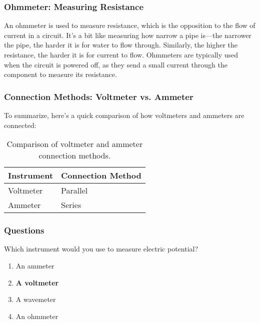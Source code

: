 \subsubsection*{Ohmmeter: Measuring Resistance}

An ohmmeter is used to measure resistance, which is the opposition to the flow of current in a circuit. It's a bit like measuring how narrow a pipe is—the narrower the pipe, the harder it is for water to flow through. Similarly, the higher the resistance, the harder it is for current to flow. Ohmmeters are typically used when the circuit is powered off, as they send a small current through the component to measure its resistance.

\subsubsection*{Connection Methods: Voltmeter vs. Ammeter}

To summarize, here's a quick comparison of how voltmeters and ammeters are connected:

\begin{table}[h]
    \centering
    \begin{tabular}{|l|l|}
        \hline
        \textbf{Instrument} & \textbf{Connection Method} \\
        \hline
        Voltmeter & Parallel \\
        \hline
        Ammeter & Series \\
        \hline
    \end{tabular}
    \caption{Comparison of voltmeter and ammeter connection methods.}
    \label{tab:voltmeter-ammeter-comparison}
\end{table}

\subsubsection*{Questions}

\begin{tcolorbox}[colback=gray!10!white,colframe=black!75!black,title={T7D01}]
    Which instrument would you use to measure electric potential?
    \begin{enumerate}[label=\Alph*),noitemsep]
        \item An ammeter
        \item \textbf{A voltmeter}
        \item A wavemeter
        \item An ohmmeter
    \end{enumerate}
\end{tcolorbox}

